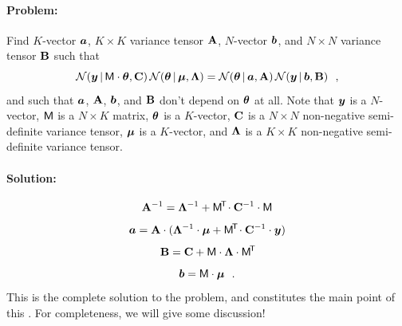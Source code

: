 \paragraph{Problem:}
Find $K$-vector $\boldsymbol{a}$, $K\times K$ variance tensor $\mathbf{A}$, $N$-vector $\boldsymbol{b}$,
and $N\times N$ variance tensor $\mathbf{B}$ such that
\begin{equation}\label{eq:problem}
\mathcal{N}\!\,(\boldsymbol{y}\,|\,\mathsf{M}\cdot\boldsymbol{\theta},\mathbf{C})\,\mathcal{N}\!\,(\boldsymbol{\theta}\,|\,\boldsymbol{\mu},\mathbf{\Lambda})
 = \mathcal{N}\!\,(\boldsymbol{\theta}\,|\,\boldsymbol{a},\mathbf{A})\,\mathcal{N}\!\,(\boldsymbol{y}\,|\,\boldsymbol{b},\mathbf{B}) ~~,
\end{equation}
and such that $\boldsymbol{a}$, $\mathbf{A}$, $\boldsymbol{b}$, and $\mathbf{B}$ don't depend on $\boldsymbol{\theta}$ at all.
Note that
$\boldsymbol{y}$ is a $N$-vector,
$\mathsf{M}$ is a $N\times K$ matrix,
$\boldsymbol{\theta}$ is a $K$-vector,
$\mathbf{C}$ is a $N\times N$ non-negative semi-definite variance tensor,
$\boldsymbol{\mu}$ is a $K$-vector,
and
$\mathbf{\Lambda}$ is a $K\times K$ non-negative semi-definite variance tensor.

\paragraph{Solution:}
\begin{equation}\label{eq:A}
\mathbf{A}^{-1} = \mathbf{\Lambda}^{-1} + \mathsf{M}^{\!\mathsf{T}\!} \cdot \mathbf{C}^{-1} \cdot \mathsf{M}
\end{equation}
\begin{equation}\label{eq:a}
\boldsymbol{a} = \mathbf{A} \cdot (\mathbf{\Lambda}^{-1} \cdot \boldsymbol{\mu} + \mathsf{M}^{\!\mathsf{T}\!} \cdot \mathbf{C}^{-1} \cdot \boldsymbol{y})
\end{equation}
\begin{equation}\label{eq:B}
\mathbf{B} = \mathbf{C} + \mathsf{M} \cdot \mathbf{\Lambda} \cdot \mathsf{M}^{\!\mathsf{T}\!}
\end{equation}
\begin{equation}\label{eq:b}
\boldsymbol{b} = \mathsf{M} \cdot \boldsymbol{\mu}
~~.
\end{equation}
This is the complete solution to the problem, and constitutes the main point
of this \documentname.
For completeness, we will give some discussion!

